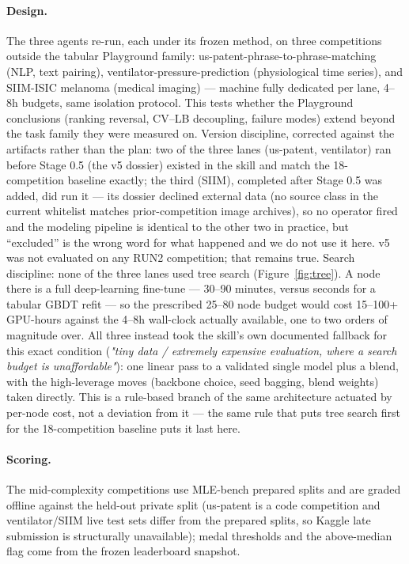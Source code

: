 \documentclass[11pt,a4paper]{article}
\begin{document}
\paragraph{Design.} The three agents re-run, each under its frozen method, on three competitions outside the tabular Playground family: us-patent-phrase-to-phrase-matching (NLP, text pairing), ventilator-pressure-prediction (physiological time series), and SIIM-ISIC melanoma (medical imaging) --- machine fully dedicated per lane, 4--8h budgets, same isolation protocol. This tests whether the Playground conclusions (ranking reversal, CV--LB decoupling, failure modes) extend beyond the task family they were measured on. Version discipline, corrected against the artifacts rather than the plan: two of the three lanes (us-patent, ventilator) ran before Stage 0.5 (the v5 dossier) existed in the skill and match the 18-competition baseline exactly; the third (SIIM), completed after Stage 0.5 was added, did run it --- its dossier declined external data (no source class in the current whitelist matches prior-competition image archives), so no operator fired and the modeling pipeline is identical to the other two in practice, but ``excluded'' is the wrong word for what happened and we do not use it here. v5 was not evaluated on any RUN2 competition; that remains true. Search discipline: none of the three lanes used tree search (Figure~\ref{fig:tree}). A node there is a full deep-learning fine-tune --- 30--90 minutes, versus seconds for a tabular GBDT refit --- so the prescribed 25--80 node budget would cost 15--100+ GPU-hours against the 4--8h wall-clock actually available, one to two orders of magnitude over. All three instead took the skill's own documented fallback for this exact condition (\emph{"tiny data / extremely expensive evaluation, where a search budget is unaffordable"}): one linear pass to a validated single model plus a blend, with the high-leverage moves (backbone choice, seed bagging, blend weights) taken directly. This is a rule-based branch of the same architecture actuated by per-node cost, not a deviation from it --- the same rule that puts tree search first for the 18-competition baseline puts it last here.

\paragraph{Scoring.} The mid-complexity competitions use MLE-bench prepared splits and are graded offline against the held-out private split (us-patent is a code competition and ventilator/SIIM live test sets differ from the prepared splits, so Kaggle late submission is structurally unavailable); medal thresholds and the above-median flag come from the frozen leaderboard snapshot.
\end{document}
